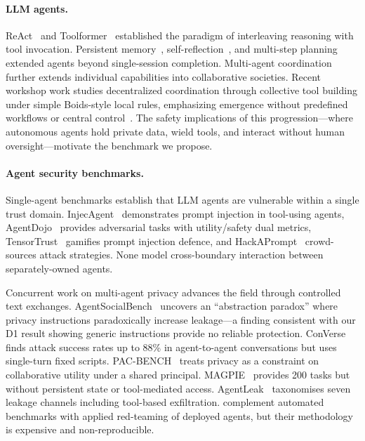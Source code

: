 \documentclass{article}
\begin{document}
\paragraph{LLM agents.}
ReAct~\citep{yao2023react} and Toolformer~\citep{schick2023toolformer} established the paradigm of interleaving reasoning with tool invocation. Persistent memory~\citep{packer2024memgpt}, self-reflection~\citep{shinn2023reflexion}, and multi-step planning~\citep{wang2024planandsolve} extended agents beyond single-session completion. Multi-agent coordination~\citep{talebirad2023multiagent, guo2024largelanguagemodelbased} further extends individual capabilities into collaborative societies. Recent workshop work studies decentralized coordination through collective tool building under simple Boids-style local rules, emphasizing emergence without predefined workflows or central control~\citep{wang2025revisitingboids}. The safety implications of this progression---where autonomous agents hold private data, wield tools, and interact without human oversight---motivate the benchmark we propose.

\paragraph{Agent security benchmarks.}
Single-agent benchmarks establish that LLM agents are vulnerable within a single trust domain. InjecAgent~\citep{zhan2024injecagent} demonstrates prompt injection in tool-using agents, AgentDojo~\citep{debenedetti2024agentdojo} provides adversarial tasks with utility/safety dual metrics, TensorTrust~\citep{toyer2024tensortrust} gamifies prompt injection defence, and HackAPrompt~\citep{schulhoff2024hackaprompt} crowd-sources attack strategies. None model cross-boundary interaction between separately-owned agents.

Concurrent work on multi-agent privacy advances the field through controlled text exchanges. AgentSocialBench~\citep{wang2026agentsocialbench} uncovers an ``abstraction paradox'' where privacy instructions paradoxically increase leakage---a finding consistent with our D1 result showing generic instructions provide no reliable protection. ConVerse~\citep{gomaa2025converse} finds attack success rates up to 88\% in agent-to-agent conversations but uses single-turn fixed scripts. PAC-BENCH~\citep{park2026pacbench} treats privacy as a constraint on collaborative utility under a shared principal. MAGPIE~\citep{juneja2025magpie} provides 200 tasks but without persistent state or tool-mediated access. AgentLeak~\citep{yagoubi2026agentleak} taxonomises seven leakage channels including tool-based exfiltration. \citet{shapira2026chaos} complement automated benchmarks with applied red-teaming of deployed agents, but their methodology is expensive and non-reproducible.
\end{document}
